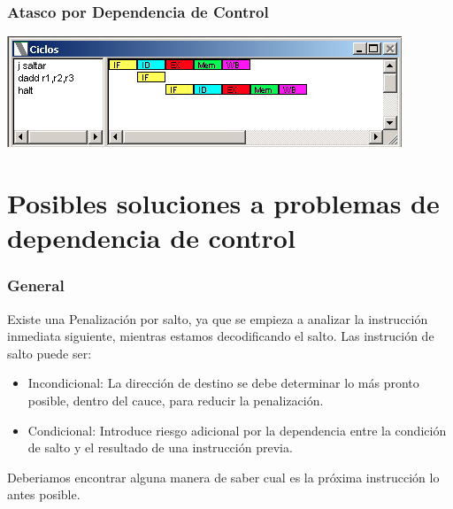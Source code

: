 \documentclass{beamer}
\begin{document}
\begin{frame}[fragile]
\frametitle{Atasco por Dependencia de Control}
\begin{block}{}
\includegraphics[scale=0.45]{atasco-branch-taken.png}
\end{block}
\end{frame}



\section{Posibles soluciones a problemas de dependencia de control}
\begin{frame}
\frametitle{General}
Existe una Penalización por salto, ya que se empieza a analizar la instrucción inmediata siguiente, mientras estamos decodificando el salto. Las instrución de salto puede ser: 
\begin{itemize}
\item Incondicional: La dirección de destino se debe determinar lo más pronto posible, dentro del cauce, para reducir la penalización.
\item Condicional: Introduce riesgo adicional por la dependencia entre la condición de salto y el resultado de una instrucción previa.
\end{itemize}
Deberiamos encontrar alguna manera de saber cual es la próxima instrucción lo antes posible.
\end{frame}
\end{document}

